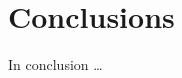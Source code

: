 \documentclass[12pt, class=report, crop=false]{standalone}
\begin{document}
\chapter{Conclusions}%
\label{chap:conclusions}

In conclusion \dots
\end{document}

